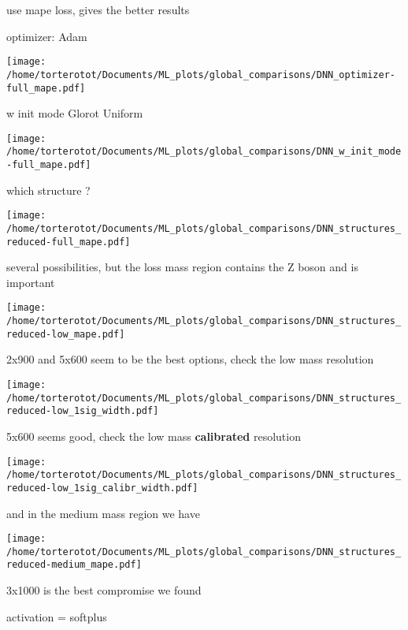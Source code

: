 use mape loss, gives the better results

optimizer: Adam

\texttt{[image: /home/torterotot/Documents/ML\_plots/global\_comparisons/DNN\_optimizer-full\_mape.pdf]}

w init mode Glorot Uniform

\texttt{[image: /home/torterotot/Documents/ML\_plots/global\_comparisons/DNN\_w\_init\_mode-full\_mape.pdf]}

which structure ?

\texttt{[image: /home/torterotot/Documents/ML\_plots/global\_comparisons/DNN\_structures\_reduced-full\_mape.pdf]}

several possibilities, but the loss mass region contains the Z boson and is important

\texttt{[image: /home/torterotot/Documents/ML\_plots/global\_comparisons/DNN\_structures\_reduced-low\_mape.pdf]}

2x900 and 5x600 seem to be the best options, check the low mass resolution

\texttt{[image: /home/torterotot/Documents/ML\_plots/global\_comparisons/DNN\_structures\_reduced-low\_1sig\_width.pdf]}

5x600 seems good, check the low mass \textbf{calibrated} resolution

\texttt{[image: /home/torterotot/Documents/ML\_plots/global\_comparisons/DNN\_structures\_reduced-low\_1sig\_calibr\_width.pdf]}

and in the medium mass region we have

\texttt{[image: /home/torterotot/Documents/ML\_plots/global\_comparisons/DNN\_structures\_reduced-medium\_mape.pdf]}

3x1000 is the best compromise we found

activation = softplus

